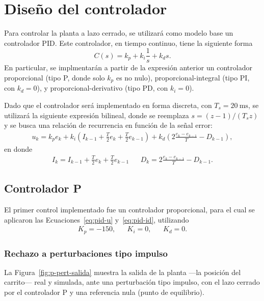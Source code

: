 \section{Diseño del controlador}

Para controlar la planta a lazo cerrado, se utilizará como modelo base un controlador PID. Este controlador, en tiempo continuo, tiene la siguiente forma
\[
    C(s) = k_p + k_i \frac{1}{s} + k_d s.
\]
En particular, se implmentarán a partir de la expresión anterior un controlador proporcional (tipo P, donde solo $k_p$ es no nulo), proporcional-integral (tipo PI, con $k_d = 0$), y proporcional-derivativo (tipo PD, con $k_i = 0$).

Dado que el controlador será implementado en forma discreta, con $T_s = \qty{20}{\ms}$, se utilizará la siguiente expresión bilineal, donde se reemplaza $s = (z - 1)/(T_s z)$ y se busca una relación de recurrencia en función de la señal error:
\begin{align}
    \label{eq:pid-u}
    u_{k} = k_{p}e_{k} + k_{i}\left(I_{k-1} + \frac{T}{2}e_{k} + \frac{T}{2}e_{k-1}\right) + k_{d}\left(2\frac{e_{k} - e_{k-1}}{T} - D_{k-1}\right),
\end{align}
en donde
\begin{align}
    \label{eq:pid-id}
    I_{k} = I_{k-1} + \frac{T}{2}e_{k} + \frac{T}{2}e_{k-1} && D_{k} = 2\frac{e_{k} - e_{k-1}}{T} - D_{k-1}.
\end{align}

\subsection{Controlador P}

El primer control implementado fue un controlador proporcional, para el cual se aplicaron las Ecuaciones~\eqref{eq:pid-u} y~\eqref{eq:pid-id}, utilizando
\begin{align*}
    K_p = -150, && K_i = 0, && K_d = 0.
\end{align*}

\subsubsection{Rechazo a perturbaciones tipo impulso}

La Figura~\ref{fig:p-pert-salida} muestra la salida de la planta ---la posición del carrito--- real y simulada, ante una perturbación tipo impulso, con el lazo cerrado por el controlador P y una referencia nula (punto de equilibrio).

